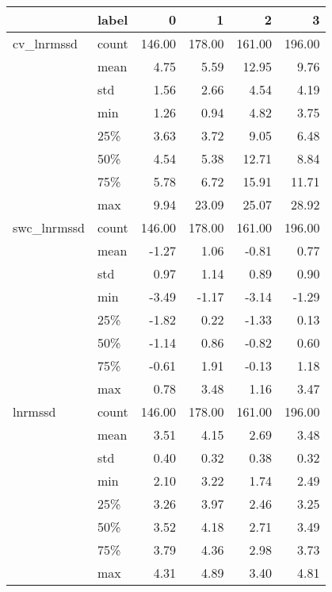 \begin{tabular}{llrrrr}
\toprule
             & label &       0 &       1 &       2 &       3 \\
\midrule
cv\_lnrmssd & count &  146.00 &  178.00 &  161.00 &  196.00 \\
             & mean &    4.75 &    5.59 &   12.95 &    9.76 \\
             & std &    1.56 &    2.66 &    4.54 &    4.19 \\
             & min &    1.26 &    0.94 &    4.82 &    3.75 \\
             & 25\% &    3.63 &    3.72 &    9.05 &    6.48 \\
             & 50\% &    4.54 &    5.38 &   12.71 &    8.84 \\
             & 75\% &    5.78 &    6.72 &   15.91 &   11.71 \\
             & max &    9.94 &   23.09 &   25.07 &   28.92 \\
swc\_lnrmssd & count &  146.00 &  178.00 &  161.00 &  196.00 \\
             & mean &   -1.27 &    1.06 &   -0.81 &    0.77 \\
             & std &    0.97 &    1.14 &    0.89 &    0.90 \\
             & min &   -3.49 &   -1.17 &   -3.14 &   -1.29 \\
             & 25\% &   -1.82 &    0.22 &   -1.33 &    0.13 \\
             & 50\% &   -1.14 &    0.86 &   -0.82 &    0.60 \\
             & 75\% &   -0.61 &    1.91 &   -0.13 &    1.18 \\
             & max &    0.78 &    3.48 &    1.16 &    3.47 \\
lnrmssd & count &  146.00 &  178.00 &  161.00 &  196.00 \\
             & mean &    3.51 &    4.15 &    2.69 &    3.48 \\
             & std &    0.40 &    0.32 &    0.38 &    0.32 \\
             & min &    2.10 &    3.22 &    1.74 &    2.49 \\
             & 25\% &    3.26 &    3.97 &    2.46 &    3.25 \\
             & 50\% &    3.52 &    4.18 &    2.71 &    3.49 \\
             & 75\% &    3.79 &    4.36 &    2.98 &    3.73 \\
             & max &    4.31 &    4.89 &    3.40 &    4.81 \\

\end{tabular}
